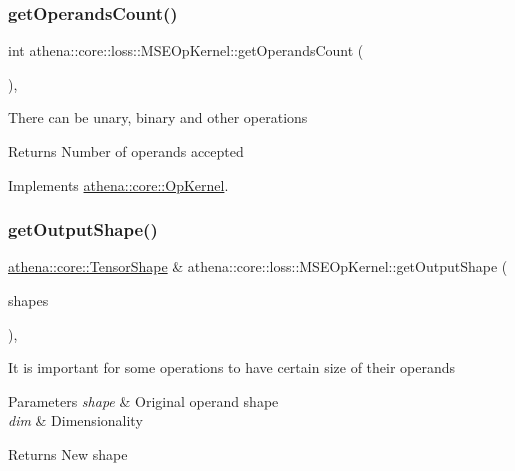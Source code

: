 \subsubsection{\texorpdfstring{get\+Operands\+Count()}{getOperandsCount()}}
{\footnotesize\ttfamily int athena\+::core\+::loss\+::\+M\+S\+E\+Op\+Kernel\+::get\+Operands\+Count (\begin{DoxyParamCaption}{ }\end{DoxyParamCaption})\hspace{0.3cm}{\ttfamily [override]}, {\ttfamily [virtual]}}

There can be unary, binary and other operations \begin{DoxyReturn}{Returns}
Number of operands accepted 
\end{DoxyReturn}


Implements \mbox{\hyperlink{classathena_1_1core_1_1_op_kernel_add97d4c132d80ecd9915acfedf7c9119}{athena\+::core\+::\+Op\+Kernel}}.

\mbox{\label{classathena_1_1core_1_1loss_1_1_m_s_e_op_kernel_a23aacffbbc73b177535511702f3c441d}} 
\subsubsection{\texorpdfstring{get\+Output\+Shape()}{getOutputShape()}}
{\footnotesize\ttfamily \mbox{\hyperlink{classathena_1_1core_1_1_tensor_shape}{athena\+::core\+::\+Tensor\+Shape}} \& athena\+::core\+::loss\+::\+M\+S\+E\+Op\+Kernel\+::get\+Output\+Shape (\begin{DoxyParamCaption}\item[{std\+::vector$<$ \mbox{\hyperlink{classathena_1_1core_1_1_tensor_shape}{athena\+::core\+::\+Tensor\+Shape}} $>$ \&}]{shapes }\end{DoxyParamCaption})\hspace{0.3cm}{\ttfamily [override]}, {\ttfamily [virtual]}}

It is important for some operations to have certain size of their operands 
\begin{DoxyParams}{Parameters}
{\em shape} & Original operand shape \\
\hline
{\em dim} & Dimensionality \\
\hline
\end{DoxyParams}
\begin{DoxyReturn}{Returns}
New shape 
\end{DoxyReturn}


